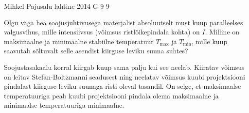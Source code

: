 {Mihkel Pajusalu} %
{lahtine} %
{2014} %
{G 9} %
{9} %
{
\ifStatement
Olgu väga hea soojusjuhtivusega materjalist absoluutselt must kuup paralleelses valgusvihus, mille intensiivsus (võimsus ristlõikepindala kohta) on $I$. Milline on maksimaalne ja minimaalne stabiilne temperatuur $T_\text{max}$ ja $T_\text{min}$, mille kuup saavutab sõltuvalt selle asendist kiirguse leviku suuna suhtes?
\fi


\ifHint
Soojustasakaalu korral kiirgab kuup sama palju kui see neelab. Kiiratav võimsus on leitav Stefan-Boltzmanni seadusest ning neelatav võimsus kuubi projektsiooni pindalast kiirguse leviku suunaga risti oleval tasandil. On selge, et maksimaalse temperatuuriga peab kuubi projektsiooni pindala olema maksimaalne ja minimaalse temperatuuriga minimaalne.
\fi


}
